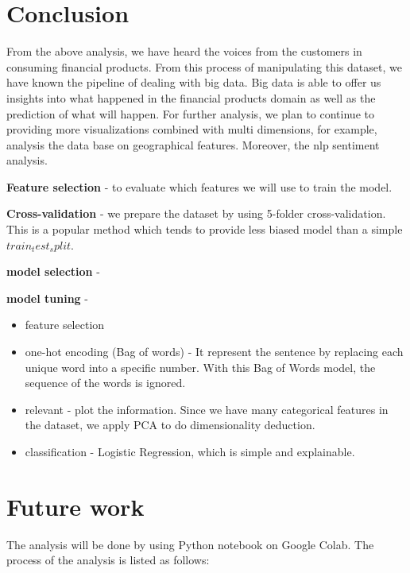\documentclass[conference]{IEEEtran}
\begin{document}
\section{Conclusion }

From the above analysis, we have heard the voices from the customers in consuming financial products. From this process of manipulating this dataset, we have known the pipeline of dealing with big data. Big data is able to offer us insights into what happened in the financial products domain as well as the prediction of what will happen. 
For further analysis, we plan to continue to providing more visualizations combined with multi dimensions, for example, analysis the data base on geographical features. Moreover, the nlp sentiment analysis.   
 
\textbf{Feature selection} - to evaluate which features we will use to train the model.

\textbf{Cross-validation} - we prepare the dataset by using 5-folder cross-validation. This is a popular method which tends to provide less biased model than a simple $train_test_split$.

\textbf{model selection} - 

\textbf{model tuning} - 


\begin{itemize}
\item feature selection
\item one-hot encoding (Bag of words) - It represent the sentence by replacing each unique word into a specific number. With this Bag of Words model, the sequence of the words is ignored.
\item relevant - plot the information. Since we have many categorical features in the dataset, we  apply PCA to do dimensionality deduction. 
\item classification - Logistic Regression, which is simple and explainable. 
\end{itemize}

\section{Future work}

The analysis will be done by using Python notebook on Google Colab. The process of the analysis is listed as follows:
\end{document}
